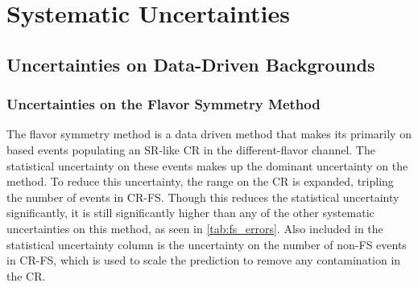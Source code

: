 
\chapter{Systematic Uncertainties} %

\label{ch:backgrounds} 

\section{Uncertainties on Data-Driven Backgrounds}

\subsection{Uncertainties on the Flavor Symmetry Method}
\label{sec:unc_fs}

The flavor symmetry method is a data driven method that makes its primarily on based events populating an \ac{SR}-like \ac{CR} in the different-flavor channel. The statistical uncertainty on these events makes up the dominant uncertainty on the method. To reduce this uncertainty, the \mll range on the \ac{CR} is expanded, tripling the number of events in CR-FS. Though this reduces the statistical uncertainty significantly, it is still significantly higher than any of the other systematic uncertainties on this method, as seen in \autoref{tab:fs_errors}. Also included in the statistical uncertainty column is the uncertainty on the number of non-\ac{FS} events in CR-FS, which is used to scale the prediction to remove any contamination in the \ac{CR}. 

